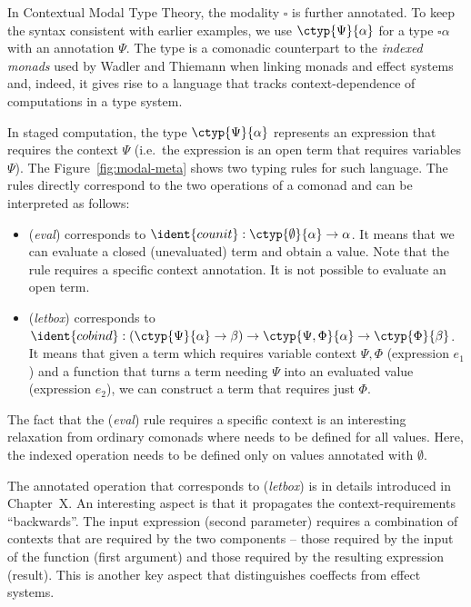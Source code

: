 In Contextual Modal Type Theory, the modality $\square$ is further annotated. To keep the syntax
consistent with earlier examples, we use $\ctyp{\Psi}{\alpha}$ for a type $\square \alpha$ with an
annotation $\Psi$. The type is a comonadic counterpart to the \emph{indexed monads} used by Wadler
and Thiemann when linking monads and effect systems and, indeed, it gives rise to a language that
tracks context-dependence of computations in a type system.

In staged computation, the type $\ctyp{\Psi}{\alpha}$ represents an expression 
that requires the context $\Psi$ (i.e.~the expression is an open term that requires variables $\Psi$).
The Figure~\ref{fig:modal-meta} shows two typing rules for such language. The rules directly
correspond to the two operations of a comonad and can be interpreted as follows:

\begin{itemize}
\item (\emph{eval}) corresponds to $\ident{counit} : \ctyp{\emptyset}{\alpha} \rightarrow \alpha$. It means
  that we can evaluate a closed (unevaluated) term and obtain a value. Note that the rule requires
  a specific context annotation. It is not possible to evaluate an open term.

\item (\emph{letbox}) corresponds to $\ident{cobind} : (\ctyp{\Psi}{\alpha} \rightarrow \beta) 
  \rightarrow \ctyp{\Psi, \Phi}{\alpha} \rightarrow \ctyp{\Phi}{\beta}$. It means that given
  a term which requires variable context $\Psi, \Phi$ (expression $e_1$) and a function that turns 
  a term needing $\Psi$ into an evaluated value (expression $e_2$), we can construct a term 
  that requires just $\Phi$.
\end{itemize}

\noindent
The fact that the (\emph{eval}) rule requires a specific context is an interesting relaxation
from ordinary comonads where  needs to be defined for all values. Here, the indexed
 operation needs to be defined only on values annotated with $\emptyset$.

The annotated  operation that corresponds to (\emph{letbox}) is in details 
introduced in Chapter~X. An interesting aspect is that it propagates the context-requirements
``backwards''. The input expression (second parameter) requires a combination of contexts that
are required by the two components -- those required by the input of the function (first
argument) and those required by the resulting expression (result). This is another key aspect
that distinguishes coeffects from effect systems.
  
